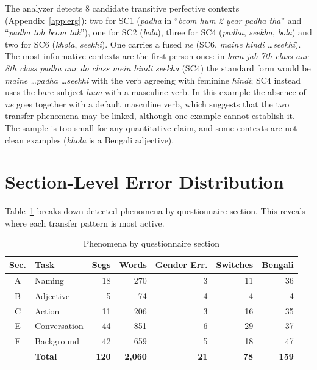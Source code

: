 \documentclass[11pt,a4paper]{report}
\begin{document}
The analyzer detects 8 candidate transitive perfective contexts (Appendix~\ref{app:erg}): two for SC1 (\textit{padha} in ``\textit{bcom hum 2 year padha tha}'' and ``\textit{padha toh bcom tak}''), one for SC2 (\textit{bola}), three for SC4 (\textit{padha}, \textit{seekha}, \textit{bola}) and two for SC6 (\textit{khola}, \textit{seekhi}). One carries a fused \textit{ne} (SC6, \textit{maine hindi \ldots seekhi}). The most informative contexts are the first-person ones: in \textit{hum jab 7th class aur 8th class padha aur do class mein hindi seekha} (SC4) the standard form would be \textit{maine \ldots padha \ldots seekhi} with the verb agreeing with feminine \textit{hindi}; SC4 instead uses the bare subject \textit{hum} with a masculine verb. In this example the absence of \textit{ne} goes together with a default masculine verb, which suggests that the two transfer phenomena may be linked, although one example cannot establish it. The sample is too small for any quantitative claim, and some contexts are not clean examples (\textit{khola} is a Bengali adjective).

\section{Section-Level Error Distribution}

Table~\ref{tab:section} breaks down detected phenomena by questionnaire section. This reveals where each transfer pattern is most active.

\begin{table}[H]
\centering
\caption{Phenomena by questionnaire section}
\label{tab:section}
\begin{tabular}{clrrrrr}
\toprule
\textbf{Sec.} & \textbf{Task} & \textbf{Segs} & \textbf{Words} & \textbf{Gender Err.} & \textbf{Switches} & \textbf{Bengali} \\
\midrule
A & Naming      & 18 & 270 &  3 & 11 & 36 \\
B & Adjective   &  5 &  74 &  4 &  4 &  4 \\
C & Action      & 11 & 206 &  3 & 16 & 35 \\
E & Conversation& 44 & 851 &  6 & 29 & 37 \\
F & Background  & 42 & 659 &  5 & 18 & 47 \\
\midrule
  & \textbf{Total} & \textbf{120} & \textbf{2,060} & \textbf{21} & \textbf{78} & \textbf{159} \\
\bottomrule
\end{tabular}
\end{table}
\end{document}
